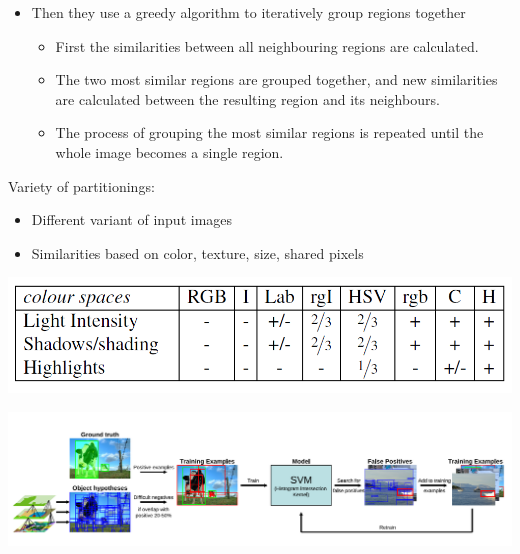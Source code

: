 \begin{frame}[allowframebreaks]
\begin{itemize}
	\item Then they use a greedy algorithm to iteratively
	group regions together	
	\begin{itemize}
		\item First the similarities between all
		neighbouring regions are calculated. 
		\item The two most similar regions
		are grouped together, and new similarities are calculated between
		the resulting region and its neighbours. 
		\item The process of grouping
		the most similar regions is repeated until the whole image becomes
		a single region.
	\end{itemize}
\end{itemize}

Variety of partitionings:
\begin{itemize}
	\item Different variant of input images
	\item Similarities based on color, texture, size, shared pixels
\end{itemize}

\begin{center}
	\includegraphics[scale=0.6]{figs/selective_search_invariance_channel}
\end{center}

\framebreak


\begin{center}
	\includegraphics[scale=0.4]{figs/pipeline_selective_search}
\end{center}



\end{frame}


